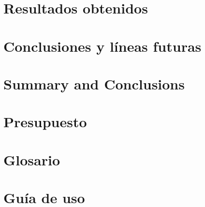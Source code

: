 \documentclass[spanish,a4paper,14pt,oneside]{extreport}
\begin{document}
\chapter{Resultados obtenidos}
\label{chapter:tres}



\newpage{\pagestyle{empty}}
\thispagestyle{empty}

\chapter{Conclusiones y líneas futuras}
\label{chapter:Conclusiones}



\newpage{\pagestyle{empty}}
\thispagestyle{empty}

\chapter{Summary and Conclusions}
\label{chapter:ingles}



\newpage{\pagestyle{empty}}
\thispagestyle{empty}

\chapter{Presupuesto}
\label{chapter:presupuesto}



\newpage{\pagestyle{empty}}
\thispagestyle{empty}
\begin{appendix}

\chapter{Glosario}
\label{appendix:1}


\chapter{Guía de uso}
\label{appendix:2}


\end{appendix}

\clearpage
{}

\printindex



\nocite{*}

\end{document}
